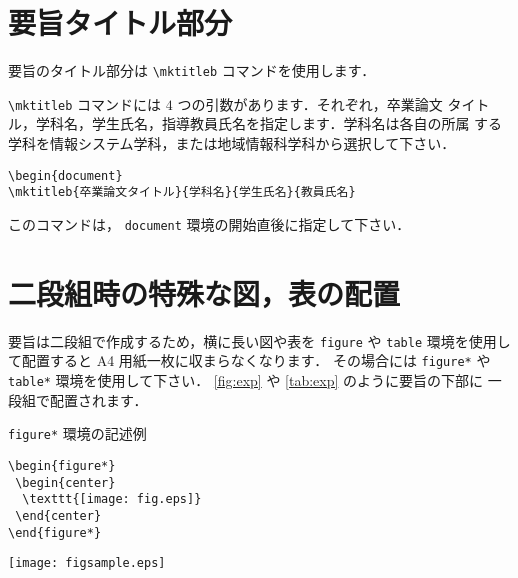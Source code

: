 \documentclass[a4j,9pt,twocolumn]{jsarticle}
\begin{document}
\section{要旨タイトル部分}
要旨のタイトル部分は \verb#\mktitleb# コマンドを使用します．

\verb#\mktitleb# コマンドには $4$ つの引数があります．それぞれ，卒業論文
タイトル，学科名，学生氏名，指導教員氏名を指定します．学科名は各自の所属
する学科を情報システム学科，または地域情報科学科から選択して下さい．
\begin{screen}
 \begin{small}
  \verb#\begin{document}#\\[-0.5em]
  \verb#\mktitleb{卒業論文タイトル}{学科名}{学生氏名}{教員氏名}#
 \end{small}
\end{screen}

このコマンドは，
\texttt{document} 環境の開始直後に指定して下さい．

\section{二段組時の特殊な図，表の配置}
要旨は二段組で作成するため，横に長い図や表を \texttt{figure} や
\texttt{table} 環境を使用して配置すると A4 用紙一枚に収まらなくなります．
その場合には \texttt{figure*} や \texttt{table*} 環境を使用して下さい．
\figurename\ref{fig:exp} や \tablename\ref{tab:exp} のように要旨の下部に
一段組で配置されます．\\[-0.5em]

\begin{itembox}[l]{\texttt{figure*} 環境の記述例}
 \begin{small}
  \verb#\begin{figure*}#\\[-0.5em]
  \verb# \begin{center}#\\[-0.5em]
  \verb#  \texttt{[image: fig.eps]}#\\[-0.5em]
  \verb# \end{center}#\\[-0.5em]
  \verb#\end{figure*}#
 \end{small}
\end{itembox}

\begin{figure*}
 \begin{center}
  \texttt{[image: figsample.eps]}
  \vspace{-1em}
  \caption{二段抜きの例（\texttt{figure*}環境）}
  \label{fig:exp}
 \end{center}
\end{figure*}
\end{document}
